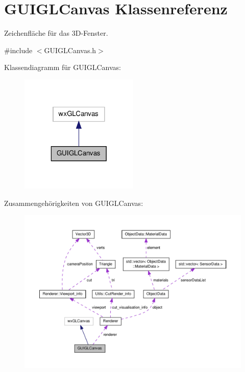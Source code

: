\hypertarget{classGUIGLCanvas}{\section{G\-U\-I\-G\-L\-Canvas Klassenreferenz}
\label{classGUIGLCanvas}
}


Zeichenfläche für das 3\-D-\/\-Fenster.  




{\ttfamily \#include $<$G\-U\-I\-G\-L\-Canvas.\-h$>$}



Klassendiagramm für G\-U\-I\-G\-L\-Canvas\-:\nopagebreak
\begin{figure}[H]
\begin{center}
\leavevmode
\includegraphics[width=160pt]{classGUIGLCanvas__inherit__graph}
\end{center}
\end{figure}


Zusammengehörigkeiten von G\-U\-I\-G\-L\-Canvas\-:\nopagebreak
\begin{figure}[H]
\begin{center}
\leavevmode
\includegraphics[width=350pt]{classGUIGLCanvas__coll__graph}
\end{center}
\end{figure}
